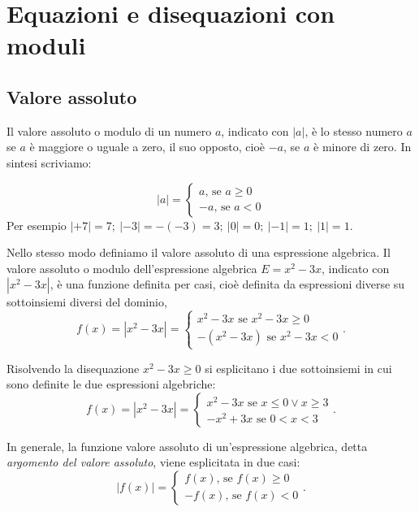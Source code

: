 \chapter{Equazioni e disequazioni con moduli}

\section{Valore assoluto}
Il valore assoluto o modulo di un numero $a$, indicato con $|a|$, è lo stesso numero $a$ se $a$ è maggiore o uguale a zero, il suo opposto, cioè $-a$, se $a$ è minore di zero. In sintesi scriviamo:

\begin{equation*}
\left|a\right|=\left\{\begin{array}{l}a\text{, se }a\ge 0\\-a\text{, se }a<0\end{array}\right.
\end{equation*}
Per esempio $\left|+7\right|=7;\ \left|-3\right|=-(-3)=3;\ \left|0\right|=0;\ \left|-1\right|=1;\ \left|1\right|=1$.

Nello stesso modo definiamo il valore assoluto di una espressione algebrica.
Il valore assoluto o modulo dell'espressione algebrica $E=x^2-3x$, indicato con $\left|x^2-3x\right|$, è una funzione definita per casi, cioè definita da espressioni diverse su sottoinsiemi diversi del dominio, 
\[f(x)=\left|x^2-3x\right|=\left\{\begin{array}{l}x^2-3x\text{ se }x^2-3x\ge 0\\-\left(x^2-3x\right)\text{ se }x^2-3x<0\end{array}\right..\]

Risolvendo la disequazione $x^2-3x\ge 0$ si esplicitano i due sottoinsiemi in cui sono definite le due espressioni algebriche: 
\[f(x)=\left|x^2-3x\right|=\left\{\begin{array}{l}x^2-3x\text{ se }x\le 0\vee x\ge 3\\-x^2+3x\text{ se }0<x<3\end{array}\right..\]

In generale, la funzione valore assoluto di un’espressione algebrica, detta \textit{argomento del valore assoluto}, viene esplicitata in due casi: 
\[\left|f(x)\right|=\left\{\begin{array}{l}{f(x)\text{, se }f(x)\ge 0}\\{-f(x)\text{, se }f(x)<0}\end{array}\right..\]

